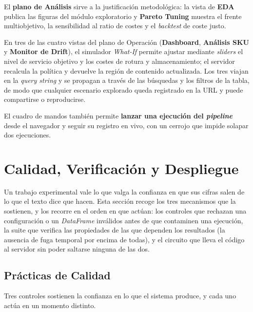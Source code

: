 El \textbf{plano de Análisis} sirve a la justificación metodológica: la vista de \textbf{EDA} publica las figuras del módulo exploratorio y \textbf{Pareto Tuning} muestra el frente multiobjetivo, la sensibilidad al ratio de costes y el \textit{backtest} de coste justo.

En tres de las cuatro vistas del plano de Operación (\textbf{Dashboard}, \textbf{Análisis SKU} y \textbf{Monitor de Drift}), el simulador \textit{What-If} permite ajustar mediante \textit{sliders} el nivel de servicio objetivo y los costes de rotura y almacenamiento; el servidor recalcula la política y devuelve la región de contenido actualizada. Los tres viajan en la \textit{query string} y se propagan a través de las búsquedas y los filtros de la tabla, de modo que cualquier escenario explorado queda registrado en la URL y puede compartirse o reproducirse.

El cuadro de mandos también permite \textbf{lanzar una ejecución del \textit{pipeline}} desde el navegador y seguir su registro en vivo, con un cerrojo que impide solapar dos ejecuciones.

\section{Calidad, Verificación y Despliegue}
\label{sec:calidad_despliegue}

Un trabajo experimental vale lo que valga la confianza en que sus cifras salen de lo que el texto dice que hacen. Esta sección recoge los tres mecanismos que la sostienen, y los recorre en el orden en que actúan: los controles que rechazan una configuración o un \textit{DataFrame} inválidos antes de que contaminen una ejecución, la suite que verifica las propiedades de las que dependen los resultados (la ausencia de fuga temporal por encima de todas), y el circuito que lleva el código al servidor sin poder saltarse ninguna de las dos.

\subsection{Prácticas de Calidad}

Tres controles sostienen la confianza en lo que el sistema produce, y cada uno actúa en un momento distinto.

